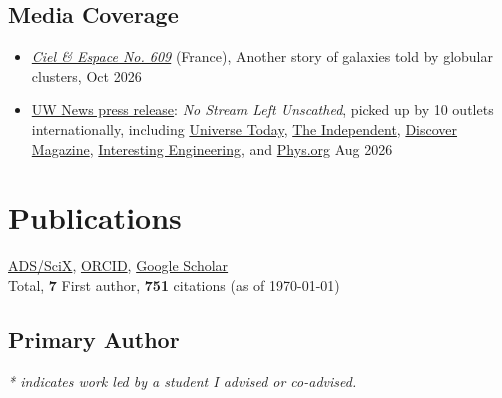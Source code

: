 \documentclass{article}
\let\olditem\item
\renewcommand{\item}{\stepcounter{itemcounter}\olditem}
\begin{document}
\subsection*{Media Coverage}
\begin{itemize}
  \setlength\itemsep{0.0em}
  \renewcommand\labelitemi{$\cdot$}
  \item \href{https://www.cieletespace.fr/le-magazine}{\textit{Ciel \& Espace No. 609}} (France), Another story of galaxies told by globular clusters, \hfill Oct 2026
  \item \href{https://www.washington.edu/news/2026/08/27/stellar-streams-dark-matter-simulation/}{UW News press release}: \textit{No Stream Left Unscathed}, picked up by 10 outlets internationally, including \href{https://www.universetoday.com/articles/simulations-show-that-dark-matter-isnt-what-gives-stellar-streams-their-kinks}{Universe Today}, \href{https://www.independent.co.uk/space/dark-matter-computer-simulations-galaxy-universe-b3041072.html}{The Independent}, \href{https://www.discovermagazine.com/bends-and-tears-in-stellar-streams-may-help-reveal-dark-matter-s-influence-49613}{Discover Magazine}, \href{https://interestingengineering.com/science/hunt-for-dark-matter-narrows}{Interesting Engineering}, and \href{https://phys.org/news/2026-08-milky-gravity-mimic-dark-clues.html}{Phys.org} \hfill Aug 2026
\end{itemize}

\section*{Publications}
\noindent \href{https://scixplorer.org/search?p=1&q=docs%28library%2FFoo0PCcyQRuwOWcZNDtIlw%29&sort=date+desc&d=astrophysics}{ADS/SciX},
\href{https://orcid.org/0000-0002-8354-7356}{ORCID},
\href{https://scholar.google.com/citations?user=sizUVx8AAAAJ&hl=en&oi=ao}{Google Scholar}\\
\noindent \textbf{} Total, \textbf{7} First author, \textbf{751} citations (as of \today)

\subsection*{Primary Author}
\textit{* indicates work led by a student I advised or co-advised.}
\end{document}
